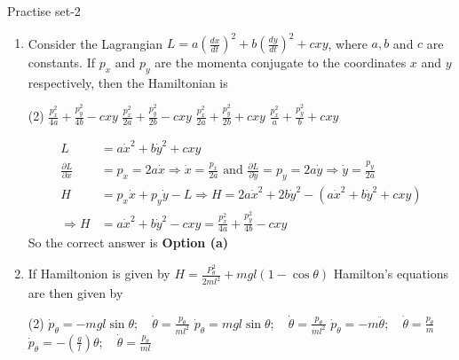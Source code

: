 \newpage
\begin{abox}
	Practise set-2
\end{abox}
\begin{enumerate}
	\item Consider the Lagrangian $L=a\left(\frac{d x}{d t}\right)^{2}+b\left(\frac{d y}{d t}\right)^{2}+c x y$, where $a, b$ and $c$ are constants. If $p_{x}$ and $p_{y}$ are the momenta conjugate to the coordinates $x$ and $y$ respectively, then the Hamiltonian is
	{}
	\begin{tasks}(2)
		\task[\textbf{a.}]$\frac{p_{x}^{2}}{4 a}+\frac{p_{y}^{2}}{4 b}-c x y$
		\task[\textbf{b.}]$\frac{p_{x}^{2}}{2 a}+\frac{p_{y}^{2}}{2 b}-c x y$
		\task[\textbf{c.}]$\frac{p_{x}^{2}}{2 a}+\frac{p_{y}^{2}}{2 b}+c x y$
		\task[\textbf{d.}] $\frac{p_{x}^{2}}{a}+\frac{p_{y}^{2}}{b}+c x y$
	\end{tasks}
\begin{answer}
	\begin{align*}
	L&=a \dot{x}^{2}+b \dot{y}^{2}+c x y\\
	\frac{\partial L}{\partial \dot{x}}&=p_{x}=2 a \dot{x} \Rightarrow \dot{x}=\frac{p_{x}}{2 a} \text { and } \frac{\partial L}{\partial \dot{y}}=p_{y}=2 a \dot{y} \Rightarrow \dot{y}=\frac{p_{y}}{2 a} \\
	H&=p_{x} \dot{x}+p_{y} \dot{y}-L \Rightarrow H=2 a \dot{x}^{2}+2 b \dot{y}^{2}-\left(a \dot{x}^{2}+b \dot{y}^{2}+c x y\right) \\
	\Rightarrow H&=a \dot{x}^{2}+b \dot{y}^{2}-c x y=\frac{p_{x}^{2}}{4 a}+\frac{p_{y}^{2}}{4 b}-c x y
	\end{align*}
		So the correct answer is \textbf{Option (a)}
\end{answer}
	\item  If Hamiltonion is given by $H=\frac{P_{\theta}^{2}}{2 m l^{2}}+m g l(1-\cos \theta)$ Hamilton's equations are then given by
	{}
	\begin{tasks}(2)
		\task[\textbf{a.}] $\dot{p}_{\theta}=-m g l \sin \theta ; \quad \dot{\theta}=\frac{p_{\theta}}{m l^{2}}$
		\task[\textbf{b.}]$\dot{p}_{\theta}=m g l \sin \theta ; \quad \dot{\theta}=\frac{p_{\theta}}{m l^{2}}$
		\task[\textbf{c.}]$\dot{p}_{\theta}=-m \ddot{\theta} ; \quad \dot{\theta}=\frac{p_{\theta}}{m}$
		\task[\textbf{d.}] $\dot{p}_{\theta}=-\left(\frac{g}{l}\right) \theta ; \quad \dot{\theta}=\frac{p_{\theta}}{m l}$
	\end{tasks}
\begin{answer}
	\begin{align*}

\end{align*}
\end{answer}
\end{enumerate}

